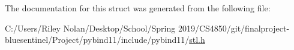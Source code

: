 The documentation for this struct was generated from the following file\+:\begin{DoxyCompactItemize}
\item 
C\+:/\+Users/\+Riley Nolan/\+Desktop/\+School/\+Spring 2019/\+C\+S4850/git/finalproject-\/bluesentinel/\+Project/pybind11/include/pybind11/\mbox{\hyperlink{stl_8h}{stl.\+h}}\end{DoxyCompactItemize}
